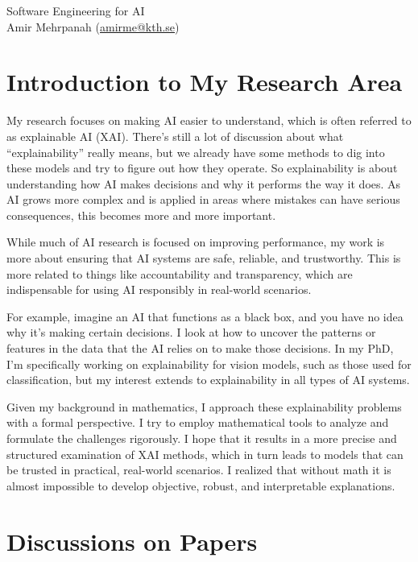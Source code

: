 \documentclass[11 pt]{article}        	%
\begin{document}
\vspace{2em}
\begin{center}
    {\Huge Software Engineering for AI}\\
    \vspace{1.5em}
    Amir Mehrpanah (\url{amirme@kth.se})
\end{center}

\section{Introduction to My Research Area}

My research focuses on making AI easier to understand, which is often referred to as explainable AI (XAI). There’s still a lot of discussion about what “explainability” really means, but we already have some methods to dig into these models and try to figure out how they operate.
So explainability is about understanding how AI makes decisions and why it performs the way it does.  As AI grows more complex and is applied in areas where mistakes can have serious consequences, this becomes more and more important.



While much of AI research is focused on improving performance, my work is more about ensuring that AI systems are safe, reliable, and trustworthy. This is more related to things like accountability and transparency, which are indispensable for using AI responsibly in real-world scenarios.



For example, imagine an AI that functions as a black box, and you have no idea why it’s making certain decisions. I look at how to uncover the patterns or features in the data that the AI relies on to make those decisions. In my PhD, I’m specifically working on explainability for vision models, such as those used for classification, but my interest extends to explainability in all types of AI systems.



Given my background in mathematics, I approach these explainability problems with a formal perspective. I try to employ mathematical tools to analyze and formulate the challenges rigorously. 
I hope that it results in a more precise and structured examination of XAI methods, which in turn leads to models that can be trusted in practical, real-world scenarios. I realized that without math it is almost impossible to develop objective, robust, and interpretable explanations.





\section{Discussions on Papers}


\newpage


\end{document}
